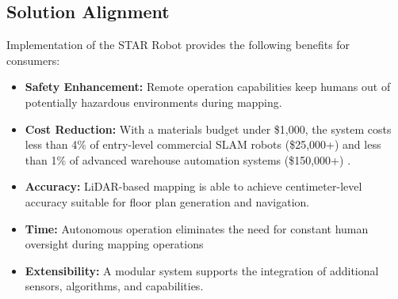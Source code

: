 \subsection{Solution Alignment}

Implementation of the STAR Robot provides the following benefits for consumers:

\begin{itemize}
    \item \textbf{Safety Enhancement:} Remote operation capabilities keep humans out of potentially hazardous environments during mapping.
    \item \textbf{Cost Reduction:} With a materials budget under \$1,000, the system costs less than 4\% of entry-level commercial SLAM robots (\$25,000+) and less than 1\% of advanced warehouse automation systems (\$150,000+) \parencite{standardbots_robot_pricing}.
    \item \textbf{Accuracy:} LiDAR-based mapping is able to achieve centimeter-level accuracy suitable for floor plan generation and navigation.
    \item \textbf{Time:} Autonomous operation eliminates the need for constant human oversight during mapping operations
    \item \textbf{Extensibility:} A modular system supports the integration of additional sensors, algorithms, and capabilities.
\end{itemize}
